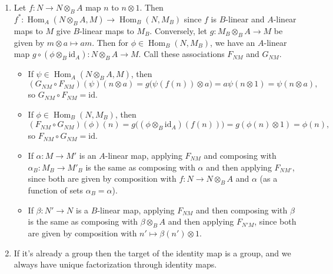 \documentclass{report}
\newcommand{\id}{{\mathrm{id}}} %
\DeclareMathOperator{\Hom}{Hom}
\begin{document}
\begin{enumerate}[label=\textbf{1.5.\Alph*.}]
	\item Let $f:N\to N\otimes_BA$ map $n$ to $n\otimes1$. Then
	      $f^*:\Hom_A(N\otimes_BA,M)\to\Hom_B(N,M_B)$ since $f$ is $B$-linear
	      and $A$-linear maps to $M$ give $B$-linear maps to $M_B$. Conversely,
	      let $g:M_B\otimes_BA\to M$ be given by $m\otimes a\mapsto am$. Then
	      for $\phi\in\Hom_B(N,M_B)$, we have an $A$-linear map
	      $g\circ(\phi\otimes_B\id_A):N\otimes_BA\to M$. Call these
	      associations $F_{NM}$ and $G_{NM}$.
	      \begin{itemize}
		      \item If $\psi\in\Hom_A(N\otimes_BA,M)$, then
		            \begin{equation*}
			            (G_{NM}\circ F_{NM})(\psi)(n\otimes a)
			            = g\bigl(\psi(f(n))\otimes a\bigr)
			            = a\psi(n\otimes1)
			            = \psi(n\otimes a),
		            \end{equation*}
		            so $G_{NM}\circ F_{NM}=\id$.

		      \item If $\phi\in\Hom_B(N,M_B)$, then
		            \begin{equation*}
			            (F_{NM}\circ G_{NM})(\phi)(n)
			            = g\bigl((\phi\otimes_B\id_A)(f(n))\bigr)
			            = g(\phi(n)\otimes1)
			            = \phi(n),
		            \end{equation*}
		            so $F_{NM}\circ G_{NM}=\id$.

		      \item If $\alpha:M\to M'$ is an $A$-linear map, applying
		            $F_{NM}$ and composing with $\alpha_B:M_B\to M'_B$ is the
		            same as composing with $\alpha$ and then applying $F_{NM'}$,
		            since both are given by composition with $f:N\to N\otimes_BA$
		            and $\alpha$ (as a function of sets $\alpha_B=\alpha$).

		      \item If $\beta:N'\to N$ is a $B$-linear map, applying $F_{NM}$
		            and then composing with $\beta$ is the same as composing
		            with $\beta\otimes_BA$ and then applying $F_{N'M}$, since
		            both are given by composition with $n'\mapsto\beta(n')\otimes1$.
	      \end{itemize}

	\item If it's already a group then the target of the identity map is a
	      group, and we always have unique factorization through identity maps.


\end{enumerate}
\end{document}

